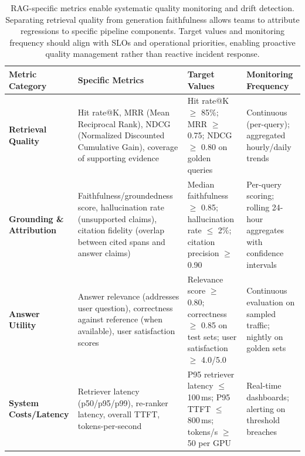 \begin{table}[t]
\centering
\small
\caption{RAG-specific metrics enable systematic quality monitoring and drift detection. Separating retrieval quality from generation faithfulness allows teams to attribute regressions to specific pipeline components. Target values and monitoring frequency should align with SLOs and operational priorities, enabling proactive quality management rather than reactive incident response.}
\label{tab:ch05_rag_metrics_taxonomy}
\setlength{\tabcolsep}{6pt}
\renewcommand{\arraystretch}{1.3}
\begin{tabularx}{\linewidth}{@{}>{\raggedright\arraybackslash}p{3.2cm}>{\raggedright\arraybackslash}X>{\raggedright\arraybackslash}X>{\raggedright\arraybackslash}X@{}}
\toprule
\rowcolor{gray!15}
\textbf{Metric Category} & \textbf{Specific Metrics} & \textbf{Target Values} & \textbf{Monitoring Frequency} \\
\midrule
\textbf{Retrieval Quality} & Hit rate@K, MRR (Mean Reciprocal Rank), NDCG (Normalized Discounted Cumulative Gain), coverage of supporting evidence & Hit rate@K $\geq$ 85\%; MRR $\geq$ 0.75; NDCG $\geq$ 0.80 on golden queries & Continuous (per-query); aggregated hourly/daily trends \\
\addlinespace[2pt]
\textbf{Grounding \& Attribution} & Faithfulness/groundedness score, hallucination rate (unsupported claims), citation fidelity (overlap between cited spans and answer claims) & Median faithfulness $\geq$ 0.85; hallucination rate $\leq$ 2\%; citation precision $\geq$ 0.90 & Per-query scoring; rolling 24-hour aggregates with confidence intervals \\
\addlinespace[2pt]
\textbf{Answer Utility} & Answer relevance (addresses user question), correctness against reference (when available), user satisfaction scores & Relevance score $\geq$ 0.80; correctness $\geq$ 0.85 on test sets; user satisfaction $\geq$ 4.0/5.0 & Continuous evaluation on sampled traffic; nightly on golden sets \\
\addlinespace[2pt]
\textbf{System Costs/Latency} & Retriever latency (p50/p95/p99), re-ranker latency, overall TTFT, tokens-per-second & P95 retriever latency $\leq$ 100\,ms; P95 TTFT $\leq$ 800\,ms; tokens/s $\geq$ 50 per GPU & Real-time dashboards; alerting on threshold breaches \\
\bottomrule
\end{tabularx}
\end{table}

